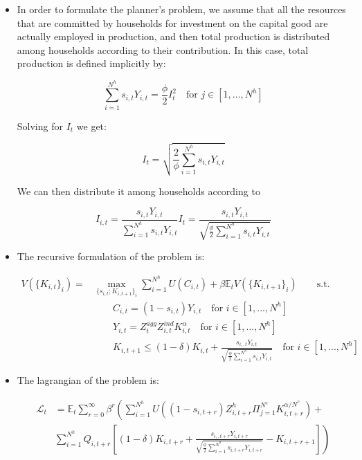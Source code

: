 \documentclass[11pt]{article}
\newcommand{\E}{\mathbb{E}}
\numberwithin{equation}{section}
\begin{document}
\begin{itemize}
	
	\item In order to formulate the planner's problem, we assume that all the resources that are committed by households for investment on the capital good are actually employed in production, and then total production is distributed among households according to their contribution. In this case, total production is defined implicitly by:
	
	$$\sum_{i=1}^{N^h} s_{i,t} Y_{i,t} = \frac{\phi}{2} I_{t}^2 \quad \text{for } j \in [1,...,N^h]$$
	
	Solving for $I_{t}$ we get:
	
	$$I_{t} =  \sqrt{\frac{2}{\phi} \sum_{i=1}^{N^h} s_{i,t} Y_{i,t}}$$
	
	We can then distribute it among households according to
	
	$$I_{i,t} = \frac{s_{i,t}Y_{i,t}}{ \sum_{i=1}^{N^h} s_{i,t} Y_{i,t}}  I_{t} =   \frac{s_{i,t}Y_{i,t}}{\sqrt{\frac{\phi}{2} \sum_{i=1}^{N^h} s_{i,t} Y_{i,t}}}$$
	
	\item The recursive formulation of the problem is:
	
	
	\begin{align*}
	V\left(\{K_{i,t}\}_{i}\right) = &\max_{\{s_{i,t};K_{i,t+1}\}_{i}} \sum_{i=1}^{N^h} U(C_{i,t}) + \beta \E_t V(\{K_{i,t+1}\}_{i}) \qquad \text{s.t.}\\
	&\qquad
	C_{i,t} = (1-s_{i,t})Y_{i,t} \quad \text{for } i \in [1,...,N^h]\\
	&\qquad
	Y_{i,t}=Z^{agg}_{t} Z^{ind}_{i,t}K_{i,t}^{\alpha}  \quad \text{for } i \in [1,...,N^h]\\
	&\qquad
	K_{i,t+1} \leq (1-\delta) K_{i,t} + \frac{s_{i,,t}Y_{i,t}}{\sqrt{\frac{\phi}{2} \sum_{i=1}^{N^h} s_{i,t} Y_{i,t}}}  \quad \text{for } i \in [1,...,N^h] 
	\end{align*}
	
	
	\item The lagrangian of the problem is: 
	
	\begin{align*}
	\mathcal{L}_{t} &= \E_t \sum_{r=0}^{\infty}\beta^r  \left( \sum_{i=1}^{N^h} U\left( (1 -  s_{i,t+r})Z^h_{i,t+r} \Pi_{j=1}^{N^c} K_{i,t+r}^{\alpha/N^c}  \right) + \right. \\
	& 	\left. \sum_{i=1}^{N^h} Q_{i,t+r} \left[(1-\delta) K_{i,t+r} + \frac{s_{i,,t+r}Y_{i,t+r}}{\sqrt{\frac{\phi}{2} \sum_{i=1}^{N^h} s_{i,t+r} Y_{i,t+r}}}-K_{i,t+r+1}\right] \right)
	\end{align*}
	

\end{itemize}
\end{document}

